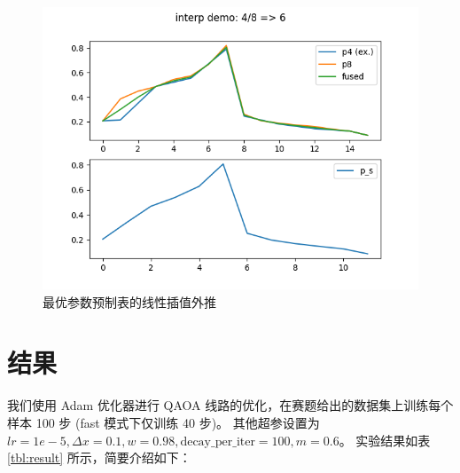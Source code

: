 \documentclass[withoutpreface,bwprint]{cumcmthesis}
\begin{document}
\begin{figure}[h!]
	\centering
	\includegraphics[scale=0.6]{figures/interp.png}
	\caption{最优参数预制表的线性插值外推}
	\label{fig:expolate}
\end{figure}


\section{结果}

我们使用 Adam 优化器进行 QAOA 线路的优化，在赛题给出的数据集上训练每个样本 100 步 (fast 模式下仅训练 40 步)。
其他超参设置为 $ lr = 1e-5, \Delta x = 0.1, w = 0.98, \mathrm{decay\_per\_iter} = 100, m = 0.6 $。
实验结果如表 \ref{tbl:result} 所示，简要介绍如下：
\end{document}

